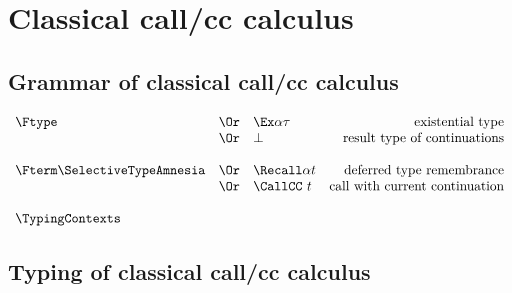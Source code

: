 \documentclass{amsart}
\begin{document}
\UniversalIntroduction

\ExistentialIntroduction

\section{Classical call/cc calculus}

\subsection{Grammar of classical call/cc calculus}

\nc{}

\[
\begin{array}{lclr}
\Ftype
&\Or& \Ex\alpha\tau & \mbox{existential type} \\
&\Or& \bot & \mbox{result type of continuations} \\
\\
\Fterm
\SelectiveTypeAmnesia
&\Or& \Recall\alpha t & \mbox{deferred type remembrance} \\
&\Or& \CallCC~t & \mbox{call with current continuation} \\
\\
\TypingContexts
\end{array}
\]

\subsection{Typing of classical call/cc calculus}
~

\nc{}

\nc{}

\nc{}
\end{document}
